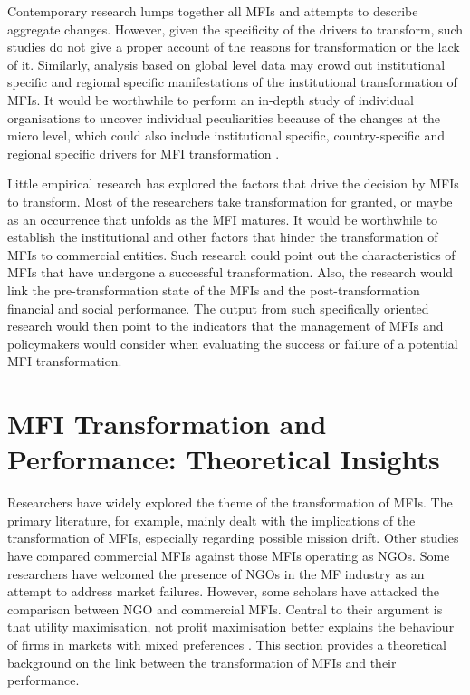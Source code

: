 \documentclass[a4paper,nobind]{templates/ociamthesis}
\begin{document}
Contemporary research lumps together all MFIs and attempts to describe aggregate changes. However, given the specificity of the drivers to transform, such studies do not give a proper account of the reasons for transformation or the lack of it. Similarly, analysis based on global level data may crowd out institutional specific and regional specific manifestations of the institutional transformation of MFIs. It would be worthwhile to perform an in-depth study of individual organisations to uncover individual peculiarities because of the changes at the micro level, which could also include institutional specific, country-specific and regional specific drivers for MFI transformation \autocite{mersland2009performance}.

Little empirical research has explored the factors that drive the decision by MFIs to transform. Most of the researchers take transformation for granted, or maybe as an occurrence that unfolds as the MFI matures. It would be worthwhile to establish the institutional and other factors that hinder the transformation of MFIs to commercial entities. Such research could point out the characteristics of MFIs that have undergone a successful transformation. Also, the research would link the pre-transformation state of the MFIs and the post-transformation financial and social performance. The output from such specifically oriented research would then point to the indicators that the management of MFIs and policymakers would consider when evaluating the success or failure of a potential MFI transformation.

\hypertarget{mfi-transformation-and-performance-theoretical-insights}{%
\section{MFI Transformation and Performance: Theoretical Insights}\label{mfi-transformation-and-performance-theoretical-insights}}

\noindent Researchers have widely explored the theme of the transformation of MFIs. The primary literature, for example,\autocite{campion1999institutional,mersland2010microfinance} mainly dealt with the implications of the transformation of MFIs, especially regarding possible mission drift. Other studies have compared commercial MFIs against those MFIs operating as NGOs. Some researchers have welcomed the presence of NGOs in the MF industry as an attempt to address market failures. However, some scholars have attacked the comparison between NGO and commercial MFIs. Central to their argument is that utility maximisation, not profit maximisation better explains the behaviour of firms in markets with mixed preferences \autocite{bos2015practice}. This section provides a theoretical background on the link between the transformation of MFIs and their performance.
\end{document}
